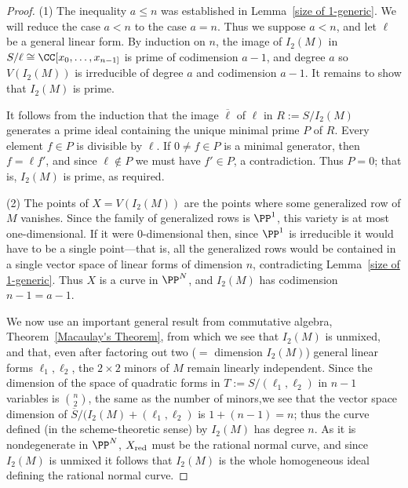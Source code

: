 \begin{proof} 
(1) The inequality $a\leq n$ was established in Lemma~\ref{size of 1-generic}. We will reduce the case $a<n$ to the case $a=n$. Thus we suppose $a<n$, and let $\ell$ be a general linear form. By induction on $n$, the image of $I_{2}(M)$ in $S/\ell \cong \CC[x_{0},\dots, x_{n-1]}$ is prime of codimension $a-1$, and degree $a$ so
$V(I_{2}(M))$ is irreducible of degree $a$ and codimension $a-1$. It remains to show
that $I_{2}(M)$ is prime.

It follows from the induction that the image $\overline \ell$ of $\ell$ in
$R :=  S/I_{2}(M)$  generates a prime ideal containing the
unique minimal prime $P$ of $R$. 
Every element $f\in P$ is divisible by $\ell$. If $0\neq f\in P$ is a minimal generator, then $f = \ell f'$, and
since $\ell\notin P$ we must have $f'\in P$, a contradiction. Thus $P = 0$; that is, $I_{2}(M)$ is
prime, as required.

(2) The points of  $X = V(I_{2}(M))$ are the points where some generalized
row of $M$ vanishes. Since the family of generalized rows is $\PP^{1}$, this variety is
at most one-dimensional. If it were 0-dimensional then, since $\PP^{1}$ is irreducible
it would have to be a single point---that is, all the generalized rows would be contained
in a single vector space of linear forms of dimension $n$, contradicting Lemma~\ref{size of 1-generic}.
Thus $X$ is a curve in $\PP^{N}$, and $I_{2}(M)$ has codimension $n-1 = a-1$.

We now use an important general result from commutative algebra, Theorem~\ref{Macaulay's Theorem}, from which we see that $I_{2}(M)$ is unmixed, and that, even after factoring out two ($=$ dimension $I_{2}(M)$) general linear forms $\ell_{1}, \ell_{2}$, the $2\times 2$ minors of $M$ remain linearly independent.   Since the dimension of the space of quadratic forms in 
$T := S/(\ell_{1}, \ell_{2})$ in $n-1$ variables is ${n\choose 2}$,  the same as the number of minors,we see that the vector space dimension of $\overline S/(I_{2}(M)+(\ell_{1}, \ell_{2})$
is $1+(n-1) = n$; thus the curve defined (in the scheme-theoretic sense) by $I_{2}(M)$ 
has degree $n$. As it is nondegenerate in $\PP^{N}$, $X_{\rm red}$ must be the rational normal curve, and since $I_{2}(M)$ is unmixed it follows that $I_{2}(M)$ is the whole homogeneous ideal
defining the rational normal curve.


\end{proof}

